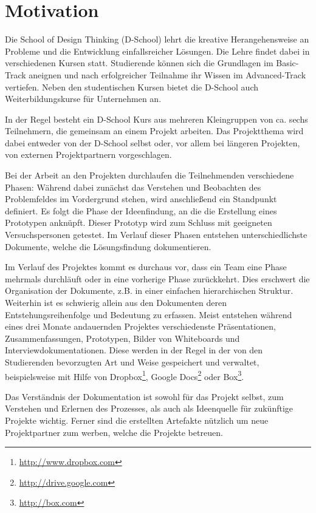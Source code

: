\chapter{Motivation}
\label{chap:Einleitung}
Die School of Design Thinking (D-School) lehrt die kreative Herangehensweise an Probleme und die Entwicklung einfallsreicher Lösungen. Die Lehre findet dabei in verschiedenen Kursen statt. Studierende können sich die Grundlagen im \gls{Basic-Track} aneignen und nach erfolgreicher Teilnahme ihr Wissen im  \gls{Advanced-Track} vertiefen. Neben den studentischen Kursen bietet die D-School auch Weiterbildungskurse für Unternehmen an.

In der Regel besteht ein D-School Kurs aus mehreren Kleingruppen von ca. sechs Teilnehmern, die gemeinsam an einem Projekt arbeiten. Das Projektthema wird dabei entweder von der D-School selbst oder, vor allem bei längeren Projekten, von externen Projektpartnern vorgeschlagen. 

Bei der Arbeit an den Projekten durchlaufen die Teilnehmenden verschiedene Phasen: Während dabei zunächst das Verstehen und Beobachten des Problemfeldes im Vordergrund stehen, wird anschließend ein Standpunkt definiert. Es folgt die Phase der Ideenfindung, an die die Erstellung eines Prototypen anknüpft. Dieser Prototyp wird zum Schluss mit geeigneten Versuchspersonen getestet. Im Verlauf dieser Phasen entstehen unterschiedlichste Dokumente, welche die Lösungsfindung dokumentieren.

Im Verlauf des Projektes kommt es durchaus vor, dass ein Team eine Phase mehrmals durchläuft oder in eine vorherige Phase zurückkehrt. Dies erschwert die Organisation der Dokumente, z.B. in einer einfachen hierarchischen Struktur. Weiterhin ist es schwierig allein aus den Dokumenten deren Entstehungsreihenfolge und Bedeutung zu erfassen. Meist entstehen während eines drei Monate andauernden Projektes verschiedenste Präsentationen, Zusammenfassungen, Prototypen, Bilder von Whiteboards und Interviewdokumentationen. Diese werden in der Regel in der von den Studierenden bevorzugten Art und Weise gespeichert und verwaltet, beispielsweise mit Hilfe von Dropbox\footnote{\url{http://www.dropbox.com}}, Google Docs\footnote{\url{http://drive.google.com}} oder \gls{Box}\footnote{\url{http://box.com}}.

Das Verständnis der Dokumentation ist sowohl für das Projekt selbst, zum Verstehen und Erlernen des Prozesses, als auch als Ideenquelle für zukünftige Projekte wichtig. Ferner sind die erstellten Artefakte nützlich um neue Projektpartner zum werben, welche die Projekte betreuen. 

